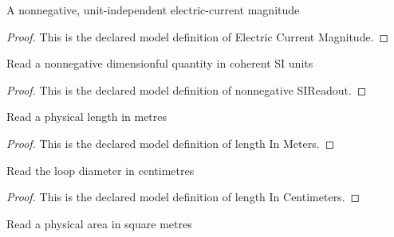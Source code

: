 \begin{definition}
  \label{def:physics:phyx-mini-0926:phyxminiproblems-problemphyxmini0926-electriccurrentmagnitude}
  A nonnegative, unit-independent electric-current magnitude
\end{definition}
\begin{proof}
  This is the declared model definition of Electric Current Magnitude.
\end{proof}
\begin{definition}
  \label{def:physics:phyx-mini-0926:phyxminiproblems-problemphyxmini0926-nonnegativesireadout}
  Read a nonnegative dimensionful quantity in coherent SI units
\end{definition}
\begin{proof}
  This is the declared model definition of nonnegative SIReadout.
\end{proof}
\begin{definition}
  \label{def:physics:phyx-mini-0926:phyxminiproblems-problemphyxmini0926-lengthinmeters}
  Read a physical length in metres
\end{definition}
\begin{proof}
  This is the declared model definition of length In Meters.
\end{proof}
\begin{definition}
  \label{def:physics:phyx-mini-0926:phyxminiproblems-problemphyxmini0926-lengthincentimeters}
  Read the loop diameter in centimetres
\end{definition}
\begin{proof}
  This is the declared model definition of length In Centimeters.
\end{proof}
\begin{definition}
  \label{def:physics:phyx-mini-0926:phyxminiproblems-problemphyxmini0926-areainsquaremeters}
  Read a physical area in square metres
\end{definition}
